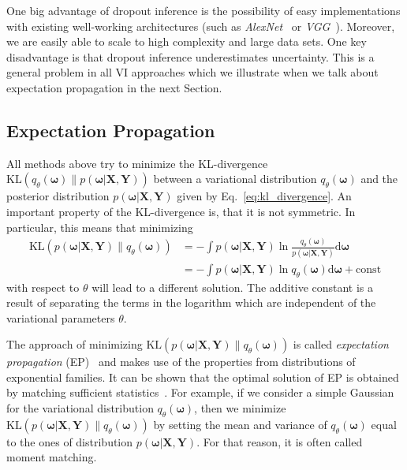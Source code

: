 \documentclass[runningheads]{llncs}
\begin{document}
One big advantage of dropout inference is the possibility of easy implementations with existing well-working architectures (such as \textit{AlexNet}~\cite{krizhevsky2012imagenet} or \textit{VGG}~\cite{vgg}).
Moreover, we are easily able to scale to high complexity and large data sets.
One key disadvantage is that dropout inference underestimates uncertainty.
This is a general problem in all VI approaches which we illustrate when we talk about expectation propagation in the next Section.

\subsection{Expectation Propagation}
\label{sec:expectation_propagation}
All methods above try to minimize the KL-divergence $\text{KL}( q_\theta(\boldsymbol{\omega}) \| p(\boldsymbol{\omega} | \mathbf{X}, \mathbf{Y}))$ between a variational distribution $q_\theta(\boldsymbol{\omega})$ and the posterior distribution $p(\boldsymbol{\omega} | \mathbf{X}, \mathbf{Y})$ given by Eq.~\ref{eq:kl_divergence}.
An important property of the KL-divergence is, that it is not symmetric.
In particular, this means that minimizing
\begin{align}
    \mathrm{KL} \left(p(\boldsymbol{\omega} | \mathbf{X}, \mathbf{Y})  \| q_\theta(\boldsymbol{\omega})\right) &= 
    - \int p(\boldsymbol{\omega} | \mathbf{X}, \mathbf{Y}) \ln \frac{q_{\theta}(\boldsymbol{\omega})}{p(\boldsymbol{\omega} | \mathbf{X}, \mathbf{Y})} \text{d}\boldsymbol{\omega} \\
    &=  - \int p(\boldsymbol{\omega} | \mathbf{X}, \mathbf{Y}) \ln q_{\theta}\left(\boldsymbol{\omega}\right)\mathrm{d}\boldsymbol{\omega} + \mathrm{const}\label{eq:EP_objective}
\end{align}
with respect to $\theta$ will lead to a different solution. The additive constant is a result of separating the terms in the logarithm which are independent of the variational parameters $\theta$.

The approach of minimizing $\mathrm{KL}(p(\boldsymbol{\omega} | \mathbf{X}, \mathbf{Y})  \| q_\theta(\boldsymbol{\omega}))$ is called \textit{expectation propagation} (EP)~\cite{minka2004power,minka2001expectation} and makes use of the properties from distributions of exponential families.
It can be shown that the optimal solution of EP is obtained by matching sufficient statistics~\cite{bishop:2006:PRML}.
For example, if we consider a simple Gaussian for the variational distribution $q_\theta(\boldsymbol{\omega})$, then we minimize $\mathrm{KL}(p(\boldsymbol{\omega} | \mathbf{X}, \mathbf{Y})  \| q_\theta(\boldsymbol{\omega}))$ by setting the mean and variance of $q_\theta(\boldsymbol{\omega})$ equal to the ones of distribution $p(\boldsymbol{\omega} | \mathbf{X}, \mathbf{Y})$.
For that reason, it is often called moment matching.
\end{document}
